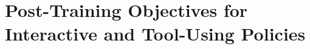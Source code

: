 \chapter{Post-Training Objectives for Interactive and Tool-Using Policies}
\label{ch:C08}










